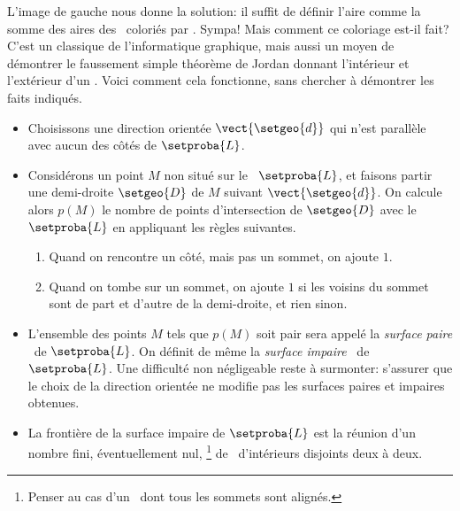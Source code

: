 L'image de gauche nous donne la solution: il suffit de définir l'aire comme la somme des aires des \ngones\ coloriés par \geogebra. Sympa! Mais comment ce coloriage est-il fait? C'est un classique de l'informatique graphique, mais aussi un moyen de démontrer le faussement simple théorème de Jordan donnant l'intérieur et l'extérieur d'un \ngone. Voici comment cela fonctionne, sans chercher à démontrer les faits indiqués.
%
\begin{itemize}
	\item Choisissons une direction orientée $\vect{\setgeo{d}}$ qui n'est parallèle avec aucun des côtés de $\setproba{L}$.

	\item Considérons un point $M$ non situé sur le \ncycle\ $\setproba{L}$, et faisons partir une demi-droite $\setgeo{D}$ de $M$ suivant $\vect{\setgeo{d}}$.
	On calcule alors $p(M)$ le nombre de points d'intersection de $\setgeo{D}$ avec le \ncycle\ $\setproba{L}$ en appliquant les règles suivantes.
	\begin{enumerate}
		\item Quand on rencontre un côté, mais pas un sommet, on ajoute $1$.

		\item Quand on tombe sur un sommet, on ajoute $1$ si les voisins du sommet sont de part et d'autre de la demi-droite, et rien sinon.
	\end{enumerate}

	\item L'ensemble des points $M$ tels que $p(M)$ soit pair sera appelé la \og \emph{surface paire} \fg\ de $\setproba{L}$. 
	On définit de même la \og \emph{surface impaire} \fg\ de $\setproba{L}$.
	Une difficulté non négligeable reste à surmonter: s'assurer que le choix de la direction orientée ne modifie pas les surfaces paires et impaires obtenues.

	\item La frontière de la surface impaire de $\setproba{L}$ est la réunion d'un nombre fini, éventuellement nul,%
	\footnote{
		Penser au cas d'un \ncycle\ dont tous les sommets sont alignés.
	}
	de \ngones\ d'intérieurs disjoints deux à deux.
\end{itemize}


